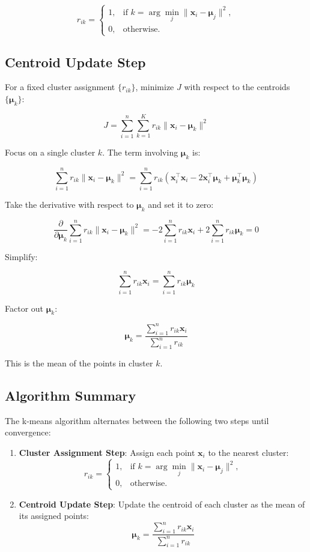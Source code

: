 \[
r_{ik} =
\begin{cases} 
1, & \text{if } k = \arg\min_{j} \| \mathbf{x}_i - \boldsymbol{\mu}_j \|^2, \\
0, & \text{otherwise.}
\end{cases}
\]

\subsection*{Centroid Update Step}
For a fixed cluster assignment \( \{ r_{ik} \} \), minimize \( J \) with respect to the centroids \( \{ \boldsymbol{\mu}_k \} \):

\[
J = \sum_{i=1}^{n} \sum_{k=1}^{K} r_{ik} \| \mathbf{x}_i - \boldsymbol{\mu}_k \|^2
\]

Focus on a single cluster \( k \). The term involving \( \boldsymbol{\mu}_k \) is:

\[
\sum_{i=1}^{n} r_{ik} \| \mathbf{x}_i - \boldsymbol{\mu}_k \|^2
= \sum_{i=1}^{n} r_{ik} \left( \mathbf{x}_i^\top \mathbf{x}_i - 2 \mathbf{x}_i^\top \boldsymbol{\mu}_k + \boldsymbol{\mu}_k^\top \boldsymbol{\mu}_k \right)
\]

Take the derivative with respect to \( \boldsymbol{\mu}_k \) and set it to zero:

\[
\frac{\partial}{\partial \boldsymbol{\mu}_k} \sum_{i=1}^{n} r_{ik} \| \mathbf{x}_i - \boldsymbol{\mu}_k \|^2 =
-2 \sum_{i=1}^{n} r_{ik} \mathbf{x}_i + 2 \sum_{i=1}^{n} r_{ik} \boldsymbol{\mu}_k = 0
\]

Simplify:

\[
\sum_{i=1}^{n} r_{ik} \mathbf{x}_i = \sum_{i=1}^{n} r_{ik} \boldsymbol{\mu}_k
\]

Factor out \( \boldsymbol{\mu}_k \):

\[
\boldsymbol{\mu}_k = \frac{\sum_{i=1}^{n} r_{ik} \mathbf{x}_i}{\sum_{i=1}^{n} r_{ik}}
\]

This is the mean of the points in cluster \( k \).

\subsection*{Algorithm Summary}
The k-means algorithm alternates between the following two steps until convergence:

\begin{enumerate}
    \item \textbf{Cluster Assignment Step}: Assign each point \( \mathbf{x}_i \) to the nearest cluster:
    \[
    r_{ik} =
    \begin{cases} 
    1, & \text{if } k = \arg\min_{j} \| \mathbf{x}_i - \boldsymbol{\mu}_j \|^2, \\
    0, & \text{otherwise.}
    \end{cases}
    \]
    \item \textbf{Centroid Update Step}: Update the centroid of each cluster as the mean of its assigned points:
    \[
    \boldsymbol{\mu}_k = \frac{\sum_{i=1}^{n} r_{ik} \mathbf{x}_i}{\sum_{i=1}^{n} r_{ik}}
    \]
\end{enumerate}

